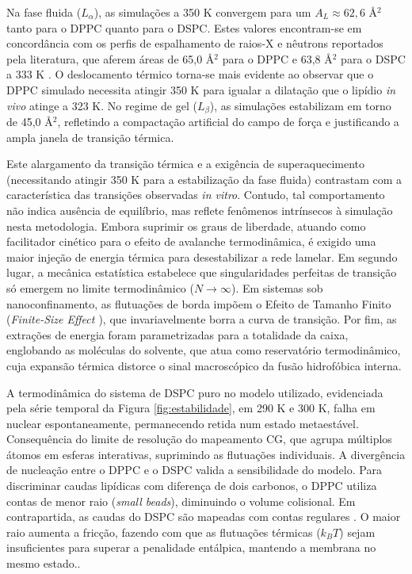 Na fase fluida ($L_{\alpha}$), as simulações a 350 K convergem para um $A_L \approx 62,6$ \AA$^2$ tanto para o DPPC quanto para o DSPC. Estes valores encontram-se em concordância com os perfis de espalhamento de raios-X e nêutrons reportados pela literatura, que aferem áreas de 65,0 \AA$^2$ para o DPPC e 63,8 \AA$^2$ para o DSPC a 333 K \cite{kucerka2011}. 
O deslocamento térmico torna-se mais evidente ao observar que o DPPC simulado necessita atingir 350 K para igualar a dilatação que o lipídio \textit{in vivo} atinge a 323 K. No regime de gel ($L_{\beta}$), as simulações estabilizam em torno de 45,0 \AA$^2$, refletindo a compactação artificial do campo de força e justificando a ampla janela de transição térmica.

Este alargamento da transição térmica e a exigência de superaquecimento (necessitando atingir 350 K para a estabilização da fase fluida) contrastam com a característica das transições observadas \textit{in vitro}. Contudo, tal comportamento não indica ausência de equilíbrio, mas reflete fenômenos intrínsecos à simulação nesta metodologia. Embora suprimir os graus de liberdade, atuando como facilitador cinético para o efeito de avalanche termodinâmica, é exigido uma maior injeção de energia térmica para desestabilizar a rede lamelar. Em segundo lugar, a mecânica estatística estabelece que singularidades perfeitas de transição só emergem no limite termodinâmico ($N \to \infty$). Em sistemas sob nanoconfinamento, as flutuações de borda impõem o Efeito de Tamanho Finito (\textit{Finite-Size Effect \cite{hal_finitesize}}\cite{piskulich2022} ), que invariavelmente borra a curva de transição. Por fim, as extrações de energia foram parametrizadas para a totalidade da caixa, englobando as moléculas do solvente, que atua como reservatório termodinâmico, cuja expansão térmica  distorce o sinal macroscópico da fusão hidrofóbica interna.

A termodinâmica do sistema de DSPC puro no modelo utilizado, evidenciada pela série temporal da Figura \ref{fig:estabilidade}, em 290 K e 300 K, falha em nuclear espontaneamente, permanecendo retida num estado metaestável. Consequência do limite de resolução do mapeamento CG, que agrupa múltiplos átomos em esferas interativas, suprimindo as flutuações individuais. A divergência de nucleação entre o DPPC e o DSPC valida a sensibilidade do modelo. Para discriminar caudas lipídicas com diferença de dois carbonos, o DPPC utiliza contas de menor raio (\textit{small beads}), diminuindo o volume colisional. Em contrapartida, as caudas do DSPC são mapeadas com contas regulares \cite{pedersen2024}. O maior raio aumenta a fricção, fazendo com que as flutuações térmicas ($k_B T$) sejam insuficientes para superar a penalidade entálpica, mantendo a membrana no mesmo estado..

